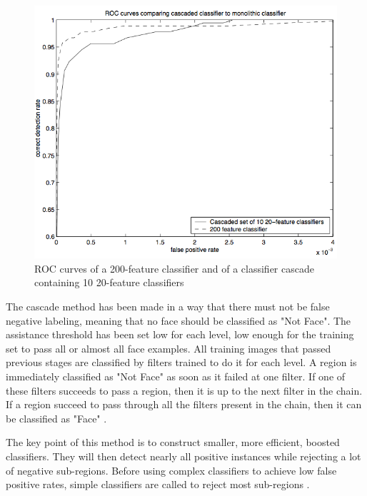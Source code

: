 \begin{figure}[!h]
\begin{center}
\noindent \includegraphics[scale=0.6]{figures/haar_feature_cascade_example_result} 
\newline
\caption{ROC curves of a 200-feature classifier and of a classifier cascade containing 10 20-feature classifiers \cite{VIO01}}
\label{haar_feature_cascade_example_result}
\end{center} 
\end{figure}

\noindent The cascade method has been made in a way that there must not be false negative labeling, meaning that no face should be classified as "Not Face". The assistance threshold has been set low for each level, low enough for the training set to pass all or almost all face examples. All training images that passed previous stages are classified by filters trained to do it for each level. A region is immediately classified as "Not Face" as soon as it failed at one filter. If one of these filters succeeds to pass a region, then it is up to the next filter in the chain. If a region succeed to pass through all the filters present in the chain, then it can be classified as "Face" \cite{HEW07}.
\newline

\noindent The key point of this method is to construct smaller, more efficient, boosted classifiers. They will then detect nearly all positive instances while rejecting a lot of negative sub-regions. Before using complex classifiers to achieve low false positive rates, simple classifiers are called to reject most sub-regions \cite{VIO01}.
\newline

